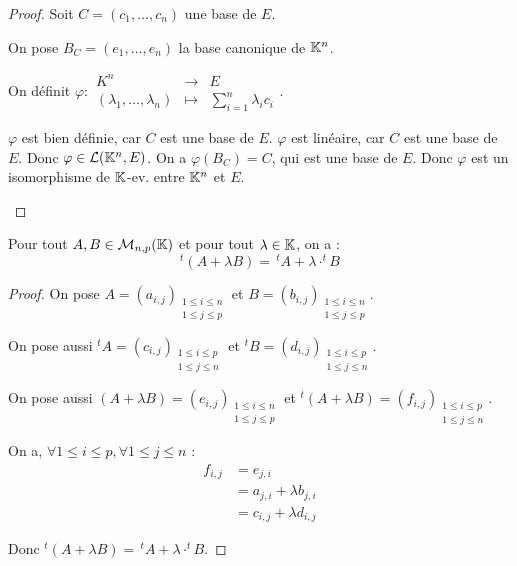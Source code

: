 \documentclass[12pt,a4paper]{report}
\begin{document}
\begin{proof}
    Soit $C = (c_1,\dots,c_n)$ une base de $E$.

    On pose $B_C = (e_1,\dots,e_n)$ la base canonique de $\mathbb{K}^n$.

    On définit $\varphi : \begin{matrix} K^n &\to &E \\ (\lambda_1,\dots,\lambda_n) &\mapsto &\sum_{i=1}^n \lambda_i c_i \end{matrix}$.

    \begin{outline}
        \1 $\varphi$ est bien définie, car $C$ est une base de $E$.
        \1 $\varphi$ est linéaire, car $C$ est une base de $E$.
        \1 Donc $\varphi \in \mathcal L(\mathbb{K}^n,E)$.
        \1 On a $\varphi(B_C) = C$, qui est une base de $E$.
        \1 Donc $\varphi$ est un isomorphisme de $\mathbb{K}$-ev. entre $\mathbb{K}^n$ et $E$.
    \end{outline}
\end{proof}

\begin{theorem}[Lemme]
    Pour tout $A,B \in \mathcal M_{n,p}(\mathbb{K})$ et pour tout $\lambda \in \mathbb{K}$, on a :
    $$^t(A+\lambda B) = \,{^t}A + \lambda \cdot ^tB$$
    \label{th:transposée}
\end{theorem}

\begin{proof}
    On pose $A = (a_{i,j})_{\substack{1 \le i \le n \\ 1 \le j \le p}}$ et $B = (b_{i,j})_{\substack{1 \le i \le n \\ 1 \le j \le p}}$.
    
    On pose aussi $^tA = (c_{i,j})_{\substack{1 \le i \le p \\ 1 \le j \le n}}$ et $^tB = (d_{i,j})_{\substack{1 \le i \le p \\ 1 \le j \le n}}$.
    
    On pose aussi $(A+\lambda B) = (e_{i,j})_{\substack{1 \le i \le n \\ 1 \le j \le p}}$ et $^t(A+\lambda B) = (f_{i,j})_{\substack{1 \le i \le p \\ 1 \le j \le n}}$.

    On a, $\forall 1 \le i \le p, \forall 1 \le j \le n$ :
    \begin{align*}
        f_{i,j} &= e_{j,i}\\
        &= a_{j,i} + \lambda b_{j,i}\\
        &= c_{i,j} + \lambda d_{i,j}
    \end{align*}

    Donc $^t(A+\lambda B) = \,{^t}A + \lambda \cdot ^tB$.
\end{proof}
\end{document}
